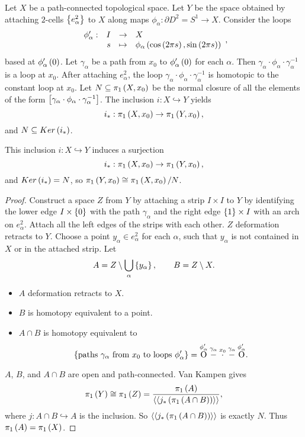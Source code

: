 Let $ X $ be a path-connected topological space. Let $ Y $ be the space obtained by attaching $ 2 $-cells $ \cb{e_\alpha^2} $ to $ X $ along maps $ \phi_\alpha : \partial D^2 = S^1 \to X $. Consider the loops
$$ \function[\phi_\alpha']{I}{X}{s}{\phi_\alpha\rb{\cos\rb{2\pi s}, \sin\rb{2\pi s}}}, $$
based at $ \phi_\alpha'\rb{0} $. Let $ \gamma_\alpha $ be a path from $ x_0 $ to $ \phi_\alpha'\rb{0} $ for each $ \alpha $. Then $ \gamma_\alpha \cdot \phi_\alpha \cdot \gamma_\alpha^{-1} $ is a loop at $ x_0 $. After attaching $ e_\alpha^2 $, the loop $ \gamma_\alpha \cdot \phi_\alpha \cdot \gamma_\alpha^{-1} $ is homotopic to the constant loop at $ x_0 $. Let $ N \subseteq \pi_1\rb{X, x_0} $ be the normal closure of all the elements of the form $ \sb{\gamma_\alpha \cdot \phi_\alpha \cdot \gamma_\alpha^{-1}} $. The inclusion $ i : X \hookrightarrow Y $ yields
$$ i_* : \pi_1\rb{X, x_0} \to \pi_1\rb{Y, x_0}, $$
and $ N \subseteq Ker\rb{i_*} $.

\begin{proposition}
\label{prop:1.26}
This inclusion $ i : X \hookrightarrow Y $ induces a surjection
$$ i_* : \pi_1\rb{X, x_0} \to \pi_1\rb{Y, x_0}, $$
and $ Ker\rb{i_*} = N $, so $ \pi_1\rb{Y, x_0} \cong \pi_1\rb{X, x_0} / N $.
\end{proposition}

\begin{proof}
Construct a space $ Z $ from $ Y $ by attaching a strip $ I \times I $ to $ Y $ by identifying the lower edge $ I \times \cb{0} $ with the path $ \gamma_\alpha $ and the right edge $ \cb{1} \times I $ with an arch on $ e_\alpha^2 $. Attach all the left edges of the strips with each other. $ Z $ deformation retracts to $ Y $. Choose a point $ y_\alpha \in e_\alpha^2 $ for each $ \alpha $, such that $ y_\alpha $ is not contained in $ X $ or in the attached strip. Let
$$ A = Z \setminus \bigcup_\alpha \cb{y_\alpha}, \qquad B = Z \setminus X. $$
\begin{itemize}
\item $ A $ deformation retracts to $ X $.
\item $ B $ is homotopy equivalent to a point.
\item $ A \cap B $ is homotopy equivalent to
$$ \cb{\text{paths} \ \gamma_\alpha \ \text{from} \ x_0 \ \text{to loops} \ \phi_\alpha'} = \overset{\phi_\alpha'}{\text{O}}\overset{\gamma_\alpha}{-}\overset{x_0}{\cdot}\overset{\gamma_\alpha}{-}\overset{\phi_\alpha'}{\text{O}}. $$
\end{itemize}
$ A $, $ B $, and $ A \cap B $ are open and path-connected. Van Kampen gives
$$ \pi_1\rb{Y} \cong \pi_1\rb{Z} = \dfrac{\pi_1\rb{A}}{\ab{\ab{j_*\rb{\pi_1\rb{A \cap B}}}}}, $$
where $ j : A \cap B \hookrightarrow A $ is the inclusion. So $ \ab{\ab{j_*\rb{\pi_1\rb{A \cap B}}}} $ is exactly $ N $. Thus $ \pi_1\rb{A} = \pi_1\rb{X} $.
\end{proof}

